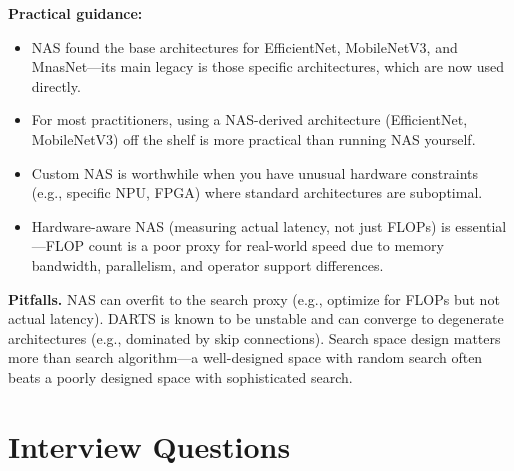\textbf{Practical guidance:}
\begin{itemize}
    \item NAS found the base architectures for EfficientNet, MobileNetV3, and MnasNet---its main legacy is those specific architectures, which are now used directly.
    \item For most practitioners, using a NAS-derived architecture (EfficientNet, MobileNetV3) off the shelf is more practical than running NAS yourself.
    \item Custom NAS is worthwhile when you have unusual hardware constraints (e.g., specific NPU, FPGA) where standard architectures are suboptimal.
    \item Hardware-aware NAS (measuring actual latency, not just FLOPs) is essential---FLOP count is a poor proxy for real-world speed due to memory bandwidth, parallelism, and operator support differences.
\end{itemize}

\textbf{Pitfalls.} NAS can overfit to the search proxy (e.g., optimize for FLOPs but not actual latency). DARTS is known to be unstable and can converge to degenerate architectures (e.g., dominated by skip connections). Search space design matters more than search algorithm---a well-designed space with random search often beats a poorly designed space with sophisticated search.

\section{Interview Questions}
\label{sec:efficient_arch_interview}

